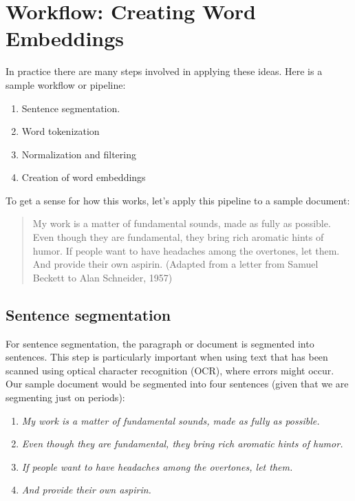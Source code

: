 \section{Workflow: Creating Word Embeddings}\label{createWordEmbeddings}

In practice there are many steps involved in applying these ideas. Here is a sample workflow or pipeline:
\begin{enumerate}
\item Sentence segmentation.
\item Word tokenization
\item Normalization and filtering
\item Creation of word embeddings
\end{enumerate}

To get a sense for how this works, let's apply this pipeline to a sample document:

\begin{quote}
My work is a matter of fundamental sounds, made as fully as possible. Even though they are fundamental, they bring rich aromatic hints of humor. If people want to have headaches among the overtones, let them. And provide their own aspirin. (Adapted from a letter from Samuel Beckett to Alan Schneider, 1957)
\end{quote}

\subsection{Sentence segmentation} 

For sentence segmentation, the paragraph or document is segmented into sentences. This step is particularly important when using text that has been scanned using optical character recognition (OCR), where errors might occur. Our sample document would be segmented into four sentences (given that we are segmenting just on periods):

\begin{enumerate}
    \item \textit{My work is a matter of fundamental sounds, made as fully as possible.}
    \item \textit{Even though they are fundamental, they bring rich aromatic hints of humor.}
    \item \textit{If people want to have headaches among the overtones, let them.}
    \item \textit{And provide their own aspirin.}
\end{enumerate}

